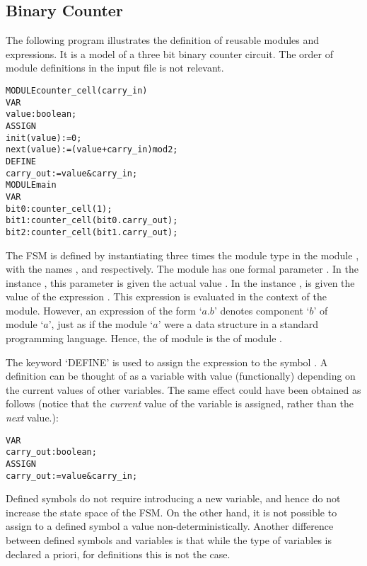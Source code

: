 \subsection{Binary Counter}
\label{Binary Counter Example}

The following program illustrates the definition of reusable modules and
expressions. It is a model of a three bit binary counter circuit.
The order of module definitions in the input file is not relevant.

\noindent
\begin{alltt}
MODULE counter_cell(carry_in)
 VAR
   value : boolean;
 ASSIGN
   init(value) := 0;
   next(value) := (value + carry_in) mod 2;
 DEFINE
  carry_out := value & carry_in;
MODULE main
 VAR
   bit0 : counter_cell(1);
   bit1 : counter_cell(bit0.carry_out);
   bit2 : counter_cell(bit1.carry_out);
\end{alltt}

The FSM is defined by instantiating three times the module
type  in the module , with the names
,  and  respectively. The  
module has one formal parameter . In
the instance , this parameter is given the actual value
. In the instance ,  is given the
value of the expression . This expression is
evaluated in the context of the  module. However, an
expression of the form `$a.b$' denotes component
`$b$' of module `$a$', just as if the module
`$a$' were a data structure in a standard programming
language. Hence, the  of module  is the
 of module .

The keyword `DEFINE' is used to assign the expression  
to the symbol . A definition can be thought of
as a variable with value (functionally) depending on the current values
of other variables. The same effect could have been obtained as follows
(notice that the \emph{current} value of the variable is assigned,
rather than the \emph{next} value.):\\
\pagebreak[3]
\begin{alltt}
VAR
  carry_out : boolean;
ASSIGN
  carry_out := value & carry_in;
\end{alltt}
Defined symbols do not require introducing a new variable, and hence do
not increase the state space of the FSM. On the other hand, it is not
possible to assign to a defined symbol a value
non-deterministically. Another difference between defined symbols and
variables is that while the type of variables is declared a priori, for
definitions this is not the case.


